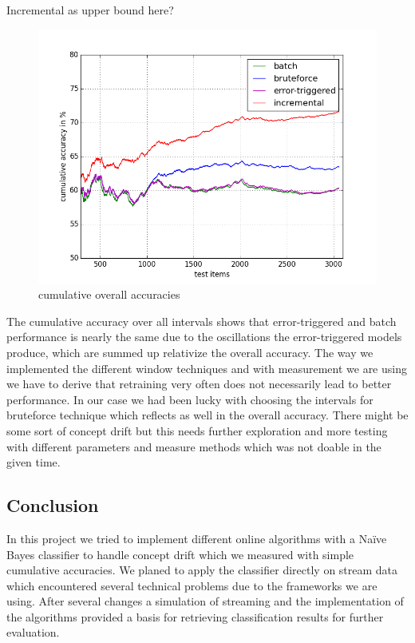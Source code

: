 \documentclass{article} %
\begin{document}
Incremental as upper bound here?




 \begin{figure}[htbp]
  \centering
  \includegraphics[scale=0.5]{./plots/allAcc.png}
  \caption{cumulative overall accuracies}
\end{figure}
The cumulative accuracy over all intervals shows that error-triggered and batch performance is nearly the same due to the oscillations the error-triggered models produce, which are summed up relativize the overall accuracy. The way we implemented the different window techniques and with measurement we are using we have to derive that retraining very often does not necessarily lead to better performance. In our case we had been lucky with choosing the intervals for bruteforce technique which reflects as well in the overall accuracy. There might be some sort of concept drift but this needs further exploration and more testing with different parameters and measure methods which was not doable in the given time.

\subsection{Conclusion}
In this project we tried to implement different online algorithms with a Na\"ive Bayes classifier to handle concept drift which we measured with simple cumulative accuracies. We planed to apply the classifier directly on stream data which encountered several technical problems due to the frameworks we are using. After several changes a simulation of streaming and the implementation of the algorithms provided a basis for retrieving classification results for further evaluation.   
\end{document}
